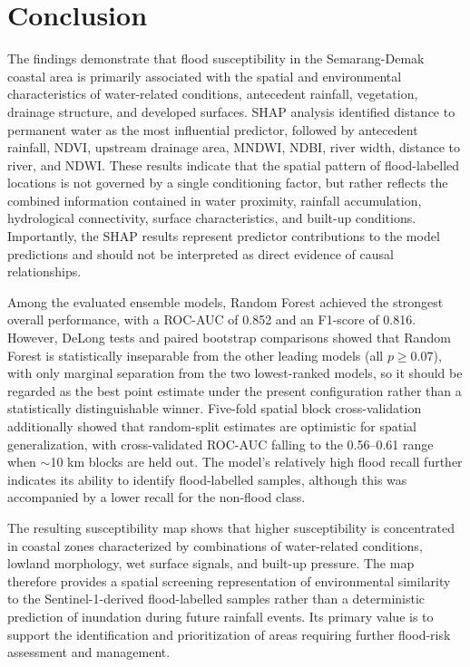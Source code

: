 \documentclass[11pt,twoside]{article}
\begin{document}
\section{Conclusion}\label{conclusions}

The findings demonstrate that flood susceptibility in the Semarang-Demak coastal area is primarily associated with the spatial and environmental characteristics of water-related conditions, antecedent rainfall, vegetation, drainage structure, and developed surfaces. SHAP analysis identified distance to permanent water as the most influential predictor, followed by antecedent rainfall, NDVI, upstream drainage area, MNDWI, NDBI, river width, distance to river, and NDWI. These results indicate that the spatial pattern of flood-labelled locations is not governed by a single conditioning factor, but rather reflects the combined information contained in water proximity, rainfall accumulation, hydrological connectivity, surface characteristics, and built-up conditions. Importantly, the SHAP results represent predictor contributions to the model predictions and should not be interpreted as direct evidence of causal relationships.

Among the evaluated ensemble models, Random Forest achieved the strongest overall performance, with a ROC-AUC of 0.852 and an F1-score of 0.816. However, DeLong tests and paired bootstrap comparisons showed that Random Forest is statistically inseparable from the other leading models (all $p \geq 0.07$), with only marginal separation from the two lowest-ranked models, so it should be regarded as the best point estimate under the present configuration rather than a statistically distinguishable winner. Five-fold spatial block cross-validation additionally showed that random-split estimates are optimistic for spatial generalization, with cross-validated ROC-AUC falling to the 0.56--0.61 range when $\sim$10 km blocks are held out. The model's relatively high flood recall further indicates its ability to identify flood-labelled samples, although this was accompanied by a lower recall for the non-flood class.

The resulting susceptibility map shows that higher susceptibility is concentrated in coastal zones characterized by combinations of water-related conditions, lowland morphology, wet surface signals, and built-up pressure. The map therefore provides a spatial screening representation of environmental similarity to the Sentinel-1-derived flood-labelled samples rather than a deterministic prediction of inundation during future rainfall events. Its primary value is to support the identification and prioritization of areas requiring further flood-risk assessment and management.
\end{document}
